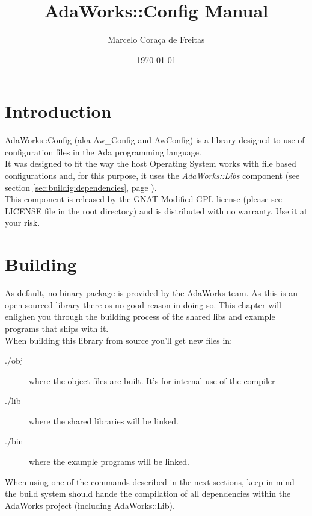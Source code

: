 \documentclass[a4paper]{book}
\title{AdaWorks::Config Manual}
\author{Marcelo Cora\c ca de Freitas }
\date{\today}
\begin{document}
\maketitle
\pagebreak
\tableofcontents
\pagebreak


\chapter{Introduction}
\label{sec:introduction}


	AdaWorks::Config (aka Aw\_Config and AwConfig) is a library designed to use of configuration files in the Ada programming language.\\

	It was designed to fit the way the host Operating System works with file based configurations and, for this purpose, it uses the \emph{AdaWorks::Libs} component (see section \ref{sec:buildig:dependencies}, page \pageref{sec:building:dependencies}).\\

	This component is released by the GNAT Modified GPL license (please see LICENSE file in the root directory) and is distributed with no warranty. Use it at your risk. 


\chapter{Building}
\label{sec:building}


	As default, no binary package is provided by the AdaWorks team. As this is an open sourced library there os no good reason in doing so. This chapter will enlighen you through the building process of the shared libs and example programs that ships with it.\\


	When building this library from source you'll get new files in:
	\begin{description}
		\item[./obj] where the object files are built. It's for internal use of the compiler
		\item[./lib] where the shared libraries will be linked.
		\item[./bin] where the example programs will be linked.
	\end{description}

	When using one of the commands described in the next sections, keep in mind the build system should hande the compilation of all dependencies within the AdaWorks project (including AdaWorks::Lib).
\end{document}
